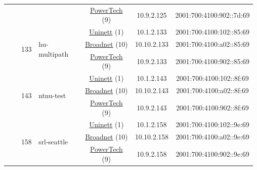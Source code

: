 \begin{small}
\begin{center}
\begin{longtable}{|c|c|c|c|c|c|c|c|}
  &  &  &  & \multicolumn{2}{|c|}{\tiny{\href{http://www.powertech.no}{PowerTech} (9)}} & \tiny{10.9.2.125} & \tiny{2001:700:4100:902::7d:69} \\* \cline{3-3}\cline{4-4}\cline{5-5}\cline{6-6}\cline{7-7}\cline{8-8}
  &  & \multirow{3}{*}{\tiny{133}} & \multicolumn{1}{|l|}{\multirow{3}{*}{\tiny{hu-multipath}}} & \multicolumn{2}{|c|}{\tiny{\href{https://www.uninett.no}{Uninett} (1)}} & \tiny{10.1.2.133} & \tiny{2001:700:4100:102::85:69} \\* \cline{5-5}\cline{6-6}\cline{7-7}\cline{8-8}
  &  &  &  & \multicolumn{2}{|c|}{\tiny{\href{https://www.broadnet.no}{Broadnet} (10)}} & \tiny{10.10.2.133} & \tiny{2001:700:4100:a02::85:69} \\* \cline{5-5}\cline{6-6}\cline{7-7}\cline{8-8}
  &  &  &  & \multicolumn{2}{|c|}{\tiny{\href{http://www.powertech.no}{PowerTech} (9)}} & \tiny{10.9.2.133} & \tiny{2001:700:4100:902::85:69} \\* \cline{3-3}\cline{4-4}\cline{5-5}\cline{6-6}\cline{7-7}\cline{8-8}
  &  & \multirow{3}{*}{\tiny{143}} & \multicolumn{1}{|l|}{\multirow{3}{*}{\tiny{ntnu-test}}} & \multicolumn{2}{|c|}{\tiny{\href{https://www.uninett.no}{Uninett} (1)}} & \tiny{10.1.2.143} & \tiny{2001:700:4100:102::8f:69} \\* \cline{5-5}\cline{6-6}\cline{7-7}\cline{8-8}
  &  &  &  & \multicolumn{2}{|c|}{\tiny{\href{https://www.broadnet.no}{Broadnet} (10)}} & \tiny{10.10.2.143} & \tiny{2001:700:4100:a02::8f:69} \\* \cline{5-5}\cline{6-6}\cline{7-7}\cline{8-8}
  &  &  &  & \multicolumn{2}{|c|}{\tiny{\href{http://www.powertech.no}{PowerTech} (9)}} & \tiny{10.9.2.143} & \tiny{2001:700:4100:902::8f:69} \\* \cline{3-3}\cline{4-4}\cline{5-5}\cline{6-6}\cline{7-7}\cline{8-8}
  &  & \multirow{3}{*}{\tiny{158}} & \multicolumn{1}{|l|}{\multirow{3}{*}{\tiny{srl-seattle}}} & \multicolumn{2}{|c|}{\tiny{\href{https://www.uninett.no}{Uninett} (1)}} & \tiny{10.1.2.158} & \tiny{2001:700:4100:102::9e:69} \\* \cline{5-5}\cline{6-6}\cline{7-7}\cline{8-8}
  &  &  &  & \multicolumn{2}{|c|}{\tiny{\href{https://www.broadnet.no}{Broadnet} (10)}} & \tiny{10.10.2.158} & \tiny{2001:700:4100:a02::9e:69} \\* \cline{5-5}\cline{6-6}\cline{7-7}\cline{8-8}
  &  &  &  & \multicolumn{2}{|c|}{\tiny{\href{http://www.powertech.no}{PowerTech} (9)}} & \tiny{10.9.2.158} & \tiny{2001:700:4100:902::9e:69} \\* \cline{3-3}\cline{4-4}\cline{5-5}\cline{6-6}\cline{7-7}\cline{8-8}

\end{longtable}
\end{center}
\end{small}
